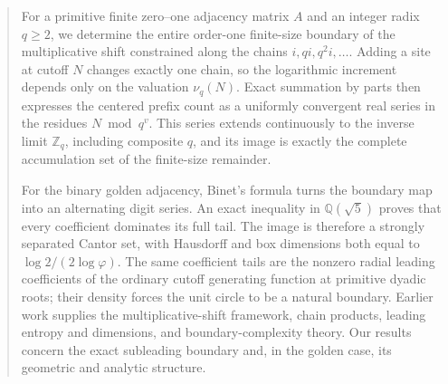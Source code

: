 \begin{abstract}
For a primitive finite zero--one adjacency matrix \(A\) and an integer
radix \(q\ge2\), we determine the entire order-one finite-size boundary of
the multiplicative shift constrained along the chains
\(i,qi,q^2i,\ldots\).  Adding a site at cutoff \(N\) changes exactly one
chain, so the logarithmic increment depends only on the valuation
\(\nu_q(N)\).  Exact summation by parts then expresses the centered prefix
count as a uniformly convergent real series in the residues
\(N\bmod q^v\).  This series extends continuously to the inverse limit
\(\mathbb Z_q\), including composite \(q\), and its image is exactly the
complete accumulation set of the finite-size remainder.

For the binary golden adjacency, Binet's formula turns the boundary map into
an alternating digit series.  An exact inequality in
\(\mathbb Q(\sqrt5)\) proves that every coefficient dominates its full tail.
The image is therefore a strongly separated Cantor set, with Hausdorff and
box dimensions both equal to
\(\log 2/(2\log\varphi)\).  The same coefficient tails are the nonzero radial
leading coefficients of the ordinary cutoff generating function at
primitive dyadic roots; their density forces the unit circle to be a natural
boundary.  Earlier work supplies the multiplicative-shift framework, chain
products, leading entropy and dimensions, and boundary-complexity theory.
Our results concern the exact subleading boundary and, in the golden case,
its geometric and analytic structure.
\end{abstract}
